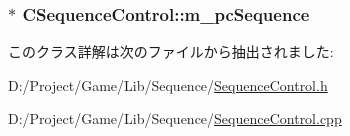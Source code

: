 \subsubsection[{m\+\_\+pc\+Sequence}]{$\ast$ C\+Sequence\+Control\+::m\+\_\+pc\+Sequence\hspace{0.3cm}{\ttfamily [private]}}\label{class_c_sequence_control_af3d3db5891e39a284d94ec49c34a153d}


このクラス詳解は次のファイルから抽出されました\+:\begin{DoxyCompactItemize}
\item 
D\+:/\+Project/\+Game/\+Lib/\+Sequence/\hyperlink{_sequence_control_8h}{Sequence\+Control.\+h}\item 
D\+:/\+Project/\+Game/\+Lib/\+Sequence/\hyperlink{_sequence_control_8cpp}{Sequence\+Control.\+cpp}\end{DoxyCompactItemize}
